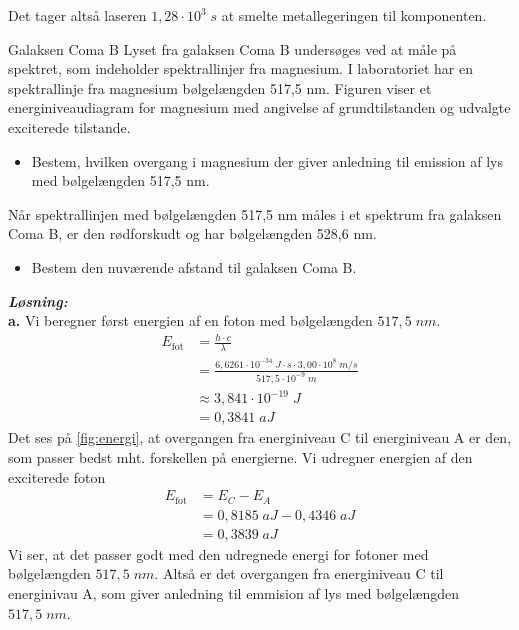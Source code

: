 \documentclass{report}
\newcommand{\sol}{\setlength{\parindent}{0cm}\textbf{\textit{Løsning:}}\setlength{\parindent}{1cm}}
\begin{document}
Det tager altså laseren $1,28 \cdot 10^3 \;\unit{s} $ at smelte metallegeringen til komponenten. 
\begin{question}{Galaksen Coma B}{}
  Lyset fra galaksen Coma B undersøges ved at måle på spektret, som indeholder spektrallinjer fra magnesium.
I laboratoriet har en spektrallinje fra magnesium bølgelængden 517,5 nm. Figuren viser et energiniveaudiagram for magnesium med angivelse af grundtilstanden og udvalgte exciterede tilstande.
\begin{itemize}
  \item[a.] Bestem, hvilken overgang i magnesium der giver anledning til emission af lys med bølgelængden 517,5 nm.
\end{itemize}
Når spektrallinjen med bølgelængden 517,5 nm måles i et spektrum fra galaksen Coma B, er den rødforskudt og har bølgelængden 528,6 nm.
\begin{itemize}
  \item[b.] Bestem den nuværende afstand til galaksen Coma B.
\end{itemize}
\end{question}
\sol \\
\textbf{a.}
Vi beregner først energien af en foton med bølgelængden $517,5 \;\unit{nm} $.
\begin{equation*}
\begin{split}
E _{\text{fot} }&=\frac{h \cdot c}{\lambda }\\
&=\frac{6,6261 \cdot 10 ^{-34} \;\unit{J \cdot s} \cdot 3,00 \cdot 10^8 \;\unit{m/s} }{517,5 \cdot 10 ^{-9}\;\unit{m} }\\
&\approx 3,841 \cdot 10 ^{-19} \;\unit{J} \\
&=0,3841 \;\unit{aJ} 
\end{split}
\end{equation*}
Det ses på \cref{fig:energi}, at overgangen fra energiniveau C til energiniveau A er den, som passer bedst mht. forskellen på energierne. 
Vi udregner energien af den exciterede foton
\begin{equation*}
\begin{split}
E _{\text{fot} }&=E_C-E_A\\
&=0,8185 \;\unit{aJ} - 0,4346 \;\unit{aJ} \\
&=0,3839 \;\unit{aJ} 
\end{split}
\end{equation*}
Vi ser, at det passer godt med den udregnede energi for fotoner med bølgelængden $517,5 \;\unit{nm} $.
Altså er det overgangen fra energiniveau C til energinivau A, som giver anledning til emmision af lys med bølgelængden $517,5 \;\unit{nm} $.
\end{document}

